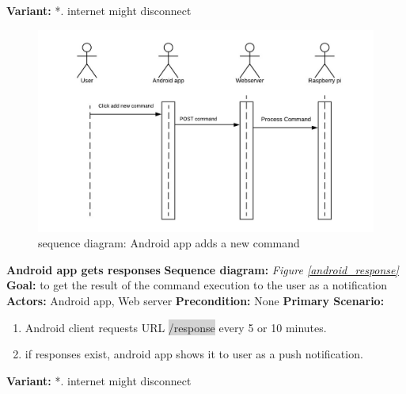 \documentclass[12pt, oneside, a4paper]{book}
\newcommand{\code}[1]{{\color{red}\colorbox{lightgray}{#1}}}
\newcommand\boldcolor[1]{\textcolor{bold}{\textbf{#1}}}
\begin{document}
				\textbf{Variant:}\newline
				\hspace*{5mm}*. internet might disconnect\\
				\begin{figure}[H]
					\includegraphics[width=\linewidth]{img/sequence_android_add.jpg}
					\caption{sequence diagram: Android app adds a new command}
					\label{android_add}
				\end{figure}
				\newpage\hspace*{-6mm}\boldcolor{Android app gets responses}
				\newline\textbf{Sequence diagram:} \textit{Figure \ref{android_response}}
				\newline\textbf{Goal:} to get the result of the command execution to the user as a notification
				\newline\textbf{Actors:} Android app, Web server
				\newline\textbf{Precondition:} None
				\newline\textbf{Primary Scenario:}	
				\begin{enumerate}[label*=\arabic*.]
					\item Android client requests URL \code{/response} every 5 or 10 minutes.
					\item if responses exist, android app shows it to user as a push notification.
				\end{enumerate}
				\textbf{Variant:}\newline
				\hspace*{5mm}*. internet might disconnect\\
\end{document}
